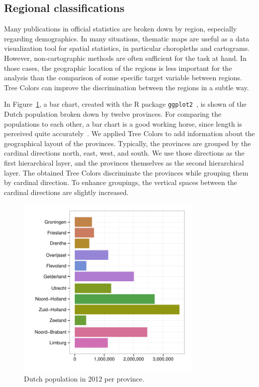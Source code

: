 \documentclass[journal]{vgtc}                %
\begin{document}




\subsection{Regional classifications}
Many publications in official statistics are broken down by region, especially regarding demographics.
In many situations, thematic maps are useful as a data visualization tool for spatial statistics, in particular choropleths and cartograms. However, non-cartographic methods are often sufficient for the task at hand. In those cases, the geographic location of the regions is less important for the analysis than the comparison of some specific target variable between regions. Tree Colors can improve the discrimination between the regions in a subtle way.

In Figure~\ref{fig:barApp}, a bar chart, created with the R package \texttt{ggplot2}~\cite{ggplot2}, is shown of the Dutch population broken down by twelve provinces. For comparing the populations to each other, a bar chart is a good working horse, since length is perceived quite accurately~\cite{Mackinlay1986}. We applied Tree Colors to add information about the geographical layout of the provinces. Typically, the provinces are grouped by the cardinal directions north, east, west, and south. We use those directions as the first hierarchical layer, and the provinces themselves as the second hierarchical layer. The obtained Tree Colors discriminate the provinces while grouping them by cardinal direction. To enhance groupings, the vertical spaces between the cardinal directions are slightly increased.

\begin{figure}[!b]
\vspace{-1ex}
  \centering
  \includegraphics[width=3.5in]{pop_bar.pdf}

  \caption{Dutch population in 2012 per province.}\label{fig:barApp}
\vspace{-1ex}

\end{figure}
\end{document}
